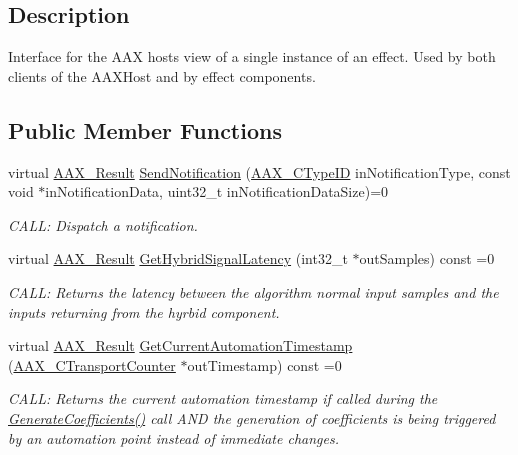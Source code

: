 \subsection{Description}
Interface for the A\+AX host\textquotesingle{}s view of a single instance of an effect. Used by both clients of the A\+A\+X\+Host and by effect components. 

\subsection*{Public Member Functions}
\begin{DoxyCompactItemize}
\item 
virtual \mbox{\hyperlink{a00392_a4d8f69a697df7f70c3a8e9b8ee130d2f}{A\+A\+X\+\_\+\+Result}} \mbox{\hyperlink{a01641_a83640488e70f990fcfeeeb400b80776b}{Send\+Notification}} (\mbox{\hyperlink{a00392_ac678f9c1fbcc26315d209f71a147a175}{A\+A\+X\+\_\+\+C\+Type\+ID}} in\+Notification\+Type, const void $\ast$in\+Notification\+Data, uint32\+\_\+t in\+Notification\+Data\+Size)=0
\begin{DoxyCompactList}\small\item\em C\+A\+LL\+: Dispatch a notification. \end{DoxyCompactList}\item 
virtual \mbox{\hyperlink{a00392_a4d8f69a697df7f70c3a8e9b8ee130d2f}{A\+A\+X\+\_\+\+Result}} \mbox{\hyperlink{a01641_afe1844d38559c2e7f8b35a23219407e6}{Get\+Hybrid\+Signal\+Latency}} (int32\+\_\+t $\ast$out\+Samples) const =0
\begin{DoxyCompactList}\small\item\em C\+A\+LL\+: Returns the latency between the algorithm normal input samples and the inputs returning from the hyrbid component. \end{DoxyCompactList}\item 
virtual \mbox{\hyperlink{a00392_a4d8f69a697df7f70c3a8e9b8ee130d2f}{A\+A\+X\+\_\+\+Result}} \mbox{\hyperlink{a01641_a0a3bdcf203a721bed5d772b125052ec3}{Get\+Current\+Automation\+Timestamp}} (\mbox{\hyperlink{a00392_ac09cd6857748cc296ac0f8bcc20dc74b}{A\+A\+X\+\_\+\+C\+Transport\+Counter}} $\ast$out\+Timestamp) const =0
\begin{DoxyCompactList}\small\item\em C\+A\+LL\+: Returns the current automation timestamp if called during the \mbox{\hyperlink{a01669_a083265b008921b6114ede387711694b7}{Generate\+Coefficients()}} call A\+ND the generation of coefficients is being triggered by an automation point instead of immediate changes. \end{DoxyCompactList}\item 

\end{DoxyCompactItemize}
